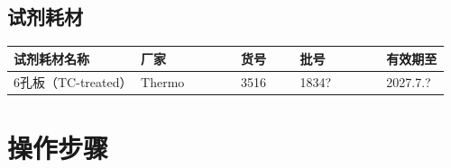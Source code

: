\documentclass[UTF8,10pt,a4paper,fontset=fandol]{ctexart}
\newcommand{\fieldvalue}[1]{#1}
\newcommand{\handwritten}[1]{#1}
\begin{document}
\subsection{试剂耗材}

\begin{center}
\begin{tabular}{|p{0.28\linewidth}|p{0.22\linewidth}|p{0.13\linewidth}|p{0.19\linewidth}|p{0.14\linewidth}|}
\hline
试剂耗材名称 & 厂家 & 货号 & 批号 & 有效期至\\
\hline
6孔板（TC-treated） &
\fieldvalue{Thermo} &
\fieldvalue{3516} &
\fieldvalue{\handwritten{1834?}} &
\fieldvalue{\handwritten{2027.7.?}}\\
\hline
\end{tabular}
\end{center}

\section{操作步骤}
\end{document}
